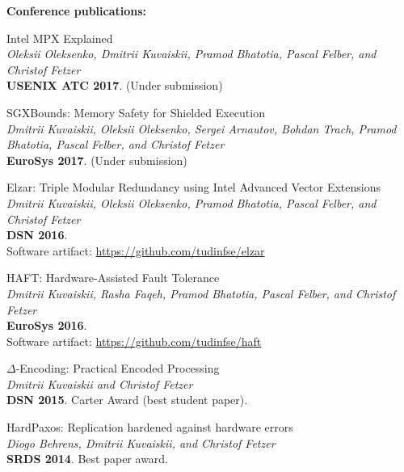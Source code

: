 \documentclass[letterpaper]{article}
\renewenvironment{itemize}{
  \begin{list}{}{
    \setlength{\leftmargin}{1.5em}
  }
}{
  \end{list}
}
\begin{document}
{\bf Conference publications:}
\begin{itemize}

\item Intel MPX Explained\\
{\em Oleksii Oleksenko, {Dmitrii Kuvaiskii}, Pramod Bhatotia,  Pascal Felber, and Christof Fetzer}\\
{\bf USENIX ATC 2017}. (Under submission)

\item SGXBounds: Memory Safety for Shielded Execution\\
{\em Dmitrii Kuvaiskii, Oleksii Oleksenko, Sergei Arnautov, Bohdan Trach, Pramod Bhatotia, Pascal Felber, and Christof Fetzer}\\
{\bf  EuroSys 2017}. (Under submission)

\item Elzar: Triple Modular Redundancy using Intel Advanced Vector Extensions\\
{\em Dmitrii Kuvaiskii, Oleksii Oleksenko, Pramod Bhatotia, Pascal Felber, and  Christof Fetzer}\\
{\bf  DSN 2016}.\\
Software artifact: \href{https://github.com/tudinfse/elzar}{https://github.com/tudinfse/elzar}

\item HAFT: Hardware-Assisted Fault Tolerance\\
{\em Dmitrii Kuvaiskii, Rasha Faqeh, Pramod Bhatotia, Pascal Felber, and  Christof Fetzer}\\
{\bf  EuroSys 2016}.\\
Software artifact: \href{https://github.com/tudinfse/haft}{https://github.com/tudinfse/haft}

\item $\Delta$-Encoding: Practical Encoded Processing\\
{\em Dmitrii Kuvaiskii and Christof Fetzer}\\
{\bf   DSN 2015}. Carter Award (best student paper).


\item HardPaxos: Replication hardened against hardware errors\\
{\em Diogo Behrens, {Dmitrii Kuvaiskii}, and Christof Fetzer}\\
{\bf SRDS 2014}. Best paper award.

\end{itemize}
\end{document}
